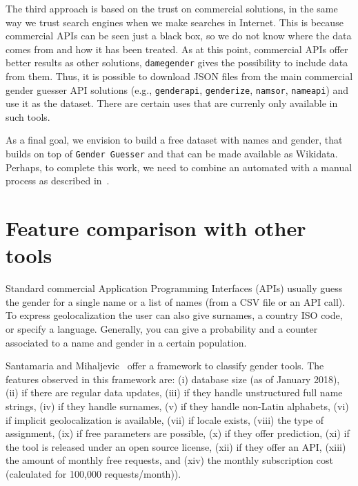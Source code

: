 \documentclass[a4paper]{article}
\begin{document}
The third approach is based on the trust on commercial solutions, in the same way we trust search engines when we make searches in Internet.
This is because commercial APIs can be seen just a black box, so we do not know where the data comes from and how it has been treated.
As at this point, commercial APIs offer better results as other solutions, \texttt{damegender} gives the possibility to include data from them.
Thus, it is possible to download JSON files from the main commercial gender guesser API solutions (e.g., \texttt{genderapi}, \texttt{genderize}, \texttt{namsor}, \texttt{nameapi}) and use it as the dataset.
There are certain uses that are currenly only available in such tools.


As a final goal, we envision to build a free dataset with names and gender, that builds on top of \texttt{Gender Guesser} and that can be made available as Wikidata. 
Perhaps, to complete this work, we need to combine an automated with a manual process as described in~\cite{10.7717/peerj-cs.156}.



\section{Feature comparison with other tools}

Standard commercial Application Programming Interfaces (APIs) usually guess the gender for a single name or a list of names (from a CSV file or an API call). 
To express geolocalization the user can also give surnames, a country ISO code, or specify a language.
Generally, you can give a probability and a counter associated to a name and gender in a certain population.

Santamaria and Mihaljevic~\cite{10.7717/peerj-cs.156} offer a framework to classify gender tools.
The features observed in this framework are: (i) database size (as of January 2018), (ii) if there are regular data updates, (iii) if they handle unstructured full name strings, (iv) if they handle surnames, (v) if they handle non-Latin alphabets, (vi) if implicit geolocalization is available, (vii) if locale exists, (viii) the type of assignment, (ix) if free parameters are possible, (x) if they offer prediction, (xi) if the tool is released under an open source license, (xii) if they offer an API, (xiii) the amount of monthly free requests, and (xiv) the monthly subscription cost (calculated for 100,000 requests/month)).
\end{document}

